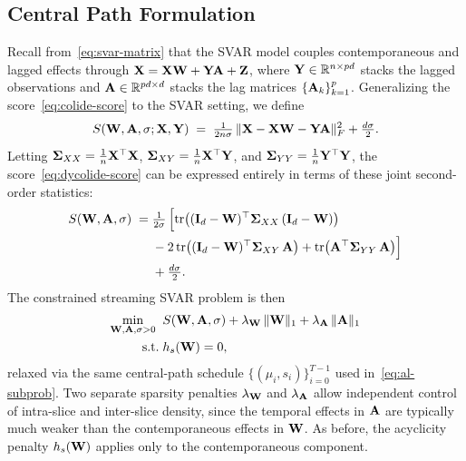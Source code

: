 \documentclass[journal,twoside]{IEEEtran}
\begin{document}
\subsection{Central Path Formulation}
\label{sec:al-form-svar}
Recall from~\eqref{eq:svar-matrix} that the SVAR model couples
contemporaneous and lagged effects through
${\mathbf X} = {\mathbf X}{\mathbf W} + {\mathbf Y}{\mathbf A} + {\mathbf Z}$, where
${\mathbf Y} \in \mathbb{R}^{n \times pd}$ stacks the lagged observations
and ${\mathbf A} \in \mathbb{R}^{pd \times d}$ stacks the lag matrices
$\{{\mathbf A}_k\}_{k=1}^{p}$. Generalizing the score~\eqref{eq:colide-score}
to the SVAR setting, we define
\begin{equation}
\label{eq:dycolide-score}
S({\mathbf W}, {\mathbf A}, \sigma; {\mathbf X}, {\mathbf Y})
\;=\;
\tfrac{1}{2n\sigma}\,\|{\mathbf X} - {\mathbf X}{\mathbf W} - {\mathbf Y}{\mathbf A}\|_F^2
+ \tfrac{d\sigma}{2}.
\end{equation}
Letting $\boldsymbol{\Sigma}_{XX} = \tfrac{1}{n} {\mathbf X}^\top {\ensuremath{\mathbf X}}$,
$\boldsymbol{\Sigma}_{XY} = \tfrac{1}{n} {\mathbf X}^\top {\ensuremath{\mathbf Y}}$, and
$\boldsymbol{\Sigma}_{YY} = \tfrac{1}{n} {\mathbf Y}^\top {\ensuremath{\mathbf Y}}$,
the score~\eqref{eq:dycolide-score} can be expressed entirely in terms
of these joint second-order statistics:
\begin{equation}
\label{eq:dycolide-score-cov}
\begin{aligned}
S({\mathbf W}, {\mathbf A}, \sigma)
\;=\;& \tfrac{1}{2\sigma}\,\Big[
  \mathrm{tr}\big( ({\mathbf I}_d - {\mathbf W})^\top \boldsymbol{\Sigma}_{XX}\,
  ({\mathbf I}_d - {\mathbf W}) \big) \\
& - 2\,\mathrm{tr}\big( ({\mathbf I}_d - {\mathbf W})^\top
  \boldsymbol{\Sigma}_{XY}\,{\mathbf A} \big)
+ \mathrm{tr}\big( {\mathbf A}^\top \boldsymbol{\Sigma}_{YY}\,{\mathbf A} \big)
\Big] \\
& + \tfrac{d \sigma}{2}.
\end{aligned}
\end{equation}
The constrained streaming SVAR problem is then
\begin{equation}
\label{eq:svar-constrained}
\begin{aligned}
\min_{{\mathbf W}, {\mathbf A}, \sigma > 0}
\;\;& S({\mathbf W}, {\mathbf A}, \sigma)
+ \lambda_{{\mathbf W}}\,\|{\mathbf W}\|_1
+ \lambda_{{\mathbf A}}\,\|{\mathbf A}\|_1 \\
\mathrm{s.t.}\;& h_s({\mathbf W}) = 0,
\end{aligned}
\end{equation}
relaxed via the same central-path schedule
$\{(\mu_i, s_i)\}_{i=0}^{T-1}$ used in~\eqref{eq:al-subprob}. Two
separate sparsity penalties $\lambda_{{\mathbf W}}$ and $\lambda_{{\mathbf A}}$
allow independent control of intra-slice and inter-slice density,
since the temporal effects in ${\mathbf A}$ are typically much weaker than
the contemporaneous effects in ${\mathbf W}$. As before, the acyclicity
penalty $h_{s}({\mathbf W})$ applies only to the contemporaneous component.
\end{document}
